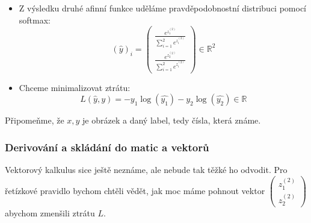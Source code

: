 \begin{itemize}
  \item  Z výsledku druhé afinní funkce uděláme pravděpodobnostní distribuci pomocí softmax:
    $$(\hat{y})_i = 
    \begin{pmatrix}
     \frac{e^{z^{(2)}_1}}{ \sum_{i=1}^{2} e^{z^{(2)}_i} } \\
     \frac{e^{z^{(2)}_2}}{ \sum_{i=1}^{2} e^{z^{(2)}_i} }
    \end{pmatrix}
    \in \mathbb{R}^2
    $$

  \item  Chceme minimalizovat ztrátu:
    $$L(\hat{y}, y) =
    -y_1 \log(\hat{y_1}) - y_2 \log(\hat{y_2})
    \in \mathbb{R}
    $$

\end{itemize}

Připomeňme, že $x, y$ je obrázek a daný label, tedy čísla, která známe.

\subsubsection{Derivování a skládání do matic a vektorů}

Vektorový kalkulus sice ještě neznáme, ale nebude tak těžké ho odvodit.
Pro řetízkové pravidlo bychom chtěli vědět, jak moc máme pohnout vektor
$
\begin{pmatrix}
  z^{(2)}_1 \\
  z^{(2)}_2
\end{pmatrix}
$
abychom zmenšili ztrátu $L$.

